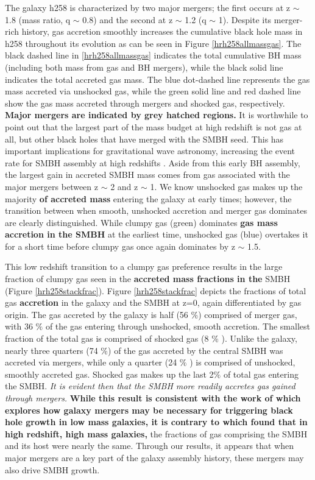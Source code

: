 \documentclass[]{emulateapj}
\begin{document}
The galaxy h258 is characterized by two major mergers; the first occurs at z $\sim$ 1.8 (mass ratio, q $\sim$ 0.8) and the second at z $\sim$ 1.2 (q $\sim$ 1). Despite its merger-rich history, gas accretion smoothly increases the cumulative black hole mass in h258 throughout its evolution as can be seen in Figure \ref{hrh258allmassgas}. The black dashed line in \ref{hrh258allmassgas} indicates the total cumulative BH mass (including both mass from gas and BH mergers), while the black solid line indicates the total accreted gas mass. The blue dot-dashed line represents the gas mass accreted via unshocked gas, while the green solid line and red dashed line show the gas mass accreted through mergers and shocked gas, respectively. \textbf{Major mergers are indicated by grey hatched regions.} It is worthwhile to point out that the largest part of the mass budget at high redshift is not gas at all, but other black holes that have merged with the SMBH seed. This has important implications for gravitational wave astronomy, increasing the event rate for SMBH assembly at high redshifts \citep{Holley-Bockelmann2010}. Aside from this early BH assembly, the largest gain in accreted SMBH mass comes from gas associated with the major mergers between z $\sim$ 2 and z $\sim$ 1. We know unshocked gas makes up the majority \textbf{of accreted mass} entering the galaxy at early times; however, the transition between when smooth, unshocked accretion and merger gas dominates are clearly distinguished. While clumpy gas (green) dominates \textbf{gas mass accretion in the SMBH} at the earliest time, unshocked gas (blue) overtakes it for a short time before clumpy gas once again dominates by z $\sim$ 1.5. 

This low redshift transition to a clumpy gas preference results in the large fraction of clumpy gas seen in the \textbf{accreted mass fractions in the} SMBH (Figure \ref{hrh258stackfrac}). Figure \ref{hrh258stackfrac} depicts the fractions of total gas \textbf{accretion} in the galaxy and the SMBH at z=0, again differentiated by gas origin. The gas accreted by the galaxy is half (56 $\%$) comprised of merger gas, with 36 $\%$ of the gas entering through unshocked, smooth accretion. The smallest fraction of the total gas is comprised of shocked gas (8 $\%$ ). Unlike the galaxy, nearly three quarters (74 $\%$) of the gas accreted by the central SMBH was accreted via mergers, while only a quarter (24 $\%$ ) is comprised of unshocked, smoothly accreted gas. Shocked gas makes up the last 2$\%$ of total gas entering the SMBH. \textit{It is evident then that the SMBH more readily accretes gas gained through mergers.} \textbf{While this result is consistent with the work of \cite{Dubois2015} which explores how galaxy mergers may be necessary for triggering black hole growth in low mass galaxies, it is contrary to \cite{Bellovary2013} which found that in high redshift, high mass galaxies,} the fractions of gas comprising the SMBH and its host were nearly the same. Through our results, it appears that when major mergers are a key part of the galaxy assembly history, these mergers may also drive SMBH growth.
\end{document}
